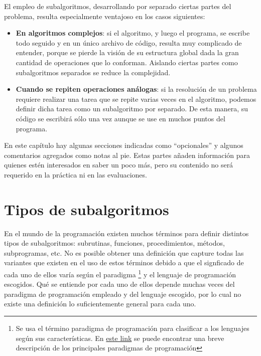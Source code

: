 \documentclass[
]{book}
\providecommand{\tightlist}{%
  \setlength{\itemsep}{0pt}\setlength{\parskip}{0pt}}
\begin{document}
El empleo de subalgoritmos, desarrollando por separado ciertas partes del problema, resulta especialmente ventajoso en los casos siguientes:

\begin{itemize}
\tightlist
\item
  \textbf{En algoritmos complejos}: si el algoritmo, y luego el programa, se escribe todo seguido y en un único archivo de código, resulta muy complicado de entender, porque se pierde la visión de su estructura global dada la gran cantidad de operaciones que lo conforman. Aislando ciertas partes como subalgoritmos separados se reduce la complejidad.
\item
  \textbf{Cuando se repiten operaciones análogas}: si la resolución de un problema requiere realizar una tarea que se repite varias veces en el algoritmo, podemos definir dicha tarea como un subalgoritmo por separado. De esta manera, su código se escribirá sólo una vez aunque se use en muchos puntos del programa.
\end{itemize}

En este capítulo hay algunas secciones indicadas como ``opcionales'' y algunos comentarios agregados como notas al pie. Estas partes añaden información para quienes estén interesados en saber un poco más, pero su contenido no será requerido en la práctica ni en las evaluaciones.

\hypertarget{tipos-de-subalgoritmos}{%
\section{Tipos de subalgoritmos}\label{tipos-de-subalgoritmos}}

En el mundo de la programación existen muchos términos para definir distintos tipos de subalgoritmos: subrutinas, funciones, procedimientos, métodos, subprogramas, etc. No es posible obtener una definición que capture todas las variantes que existen en el uso de estos términos debido a que el signficado de cada uno de ellos varía según el paradigma
\footnote{Se usa el término paradigma de programación para clasificar a los lenguajes según sus características. En \href{https://hackr.io/blog/programming-paradigms}{este link} se puede encontrar una breve descripción de los principales paradigmas de programación}
y el lenguaje de programación escogidos. Qué se entiende por cada uno de ellos depende muchas veces del paradigma de programación empleado y del lenguaje escogido, por lo cual no existe una definición lo suficientemente general para cada uno.
\end{document}

